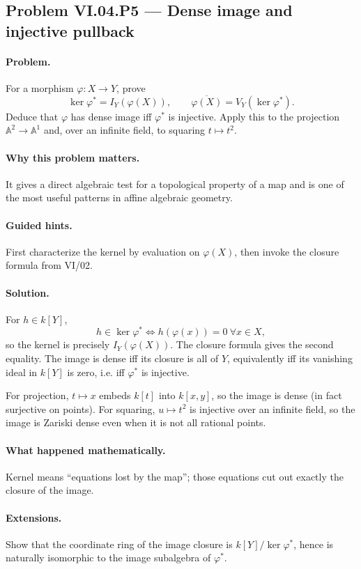 \subsection*{Problem VI.04.P5 --- Dense image and injective pullback}
\label{prob:vi04-p5}
\paragraph{Problem.}
For a morphism \(\varphi:X\to Y\), prove
\[
\ker\varphi^*=I_Y(\varphi(X)),
\qquad
\overline{\varphi(X)}=V_Y(\ker\varphi^*).
\]
Deduce that \(\varphi\) has dense image iff \(\varphi^*\) is injective.  Apply this to the
projection \(\mathbb A^2\to\mathbb A^1\) and, over an infinite field, to squaring
\(t\mapsto t^2\).
\ifdefined\FullProblemDossiers
\paragraph{Why this problem matters.}  It gives a direct algebraic test for a topological
property of a map and is one of the most useful patterns in affine algebraic geometry.
\paragraph{Guided hints.}  First characterize the kernel by evaluation on \(\varphi(X)\),
then invoke the closure formula from VI/02.
\paragraph{Solution.}
For \(h\in k[Y]\),
\[
h\in\ker\varphi^*\iff h(\varphi(x))=0\ \forall x\in X,
\]
so the kernel is precisely \(I_Y(\varphi(X))\).  The closure formula gives the second equality.  The image is dense iff its closure is all of \(Y\), equivalently iff its
vanishing ideal in \(k[Y]\) is zero, i.e. iff \(\varphi^*\) is injective.

For projection, \(t\mapsto x\) embeds \(k[t]\) into \(k[x,y]\), so the image is dense
(in fact surjective on points).  For squaring, \(u\mapsto t^2\) is injective over an
infinite field, so the image is Zariski dense even when it is not all rational points.
\paragraph{What happened mathematically.}  Kernel means ``equations lost by the map'';
those equations cut out exactly the closure of the image.
\paragraph{Extensions.}  Show that the coordinate ring of the image closure is
\(k[Y]/\ker\varphi^*\), hence is naturally isomorphic to the image subalgebra of
\(\varphi^*\).
\fi
